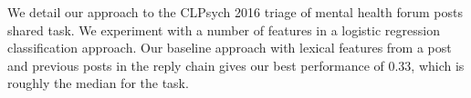 We detail our approach to the CLPsych 2016 triage of mental health forum posts shared task. We experiment with a number of features in a logistic regression classification approach. Our baseline approach with lexical features from a post and previous posts in the reply chain gives our best performance of 0.33, which is roughly the median for the task.
